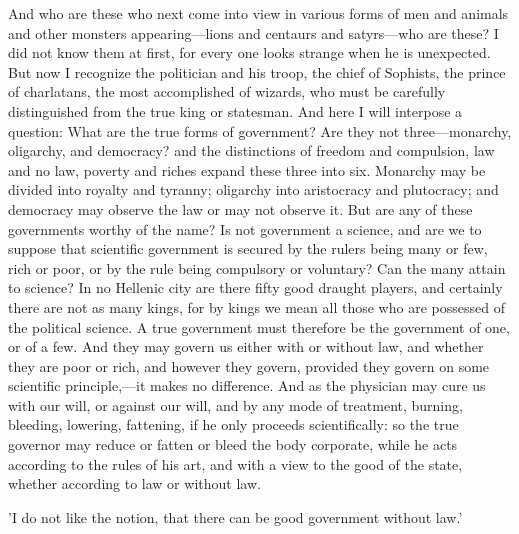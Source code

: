 \documentclass[11pt,letter]{article}
\begin{document}
\par  And who are these who next come into view in various forms of men and animals and other monsters appearing—lions and centaurs and satyrs—who are these? I did not know them at first, for every one looks strange when he is unexpected. But now I recognize the politician and his troop, the chief of Sophists, the prince of charlatans, the most accomplished of wizards, who must be carefully distinguished from the true king or statesman. And here I will interpose a question: What are the true forms of government? Are they not three—monarchy, oligarchy, and democracy? and the distinctions of freedom and compulsion, law and no law, poverty and riches expand these three into six. Monarchy may be divided into royalty and tyranny; oligarchy into aristocracy and plutocracy; and democracy may observe the law or may not observe it. But are any of these governments worthy of the name? Is not government a science, and are we to suppose that scientific government is secured by the rulers being many or few, rich or poor, or by the rule being compulsory or voluntary? Can the many attain to science? In no Hellenic city are there fifty good draught players, and certainly there are not as many kings, for by kings we mean all those who are possessed of the political science. A true government must therefore be the government of one, or of a few. And they may govern us either with or without law, and whether they are poor or rich, and however they govern, provided they govern on some scientific principle,—it makes no difference. And as the physician may cure us with our will, or against our will, and by any mode of treatment, burning, bleeding, lowering, fattening, if he only proceeds scientifically: so the true governor may reduce or fatten or bleed the body corporate, while he acts according to the rules of his art, and with a view to the good of the state, whether according to law or without law.

\par  'I do not like the notion, that there can be good government without law.'
\end{document}
